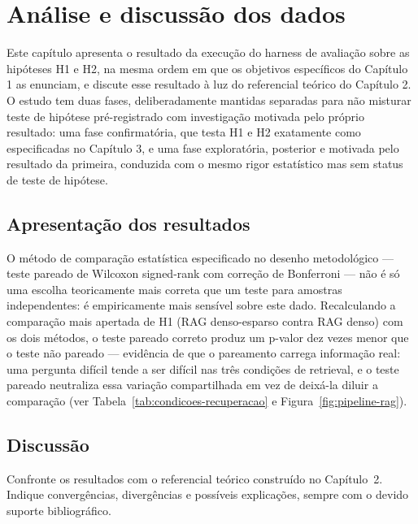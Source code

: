 
\section{Análise e discussão dos dados}

Este capítulo apresenta o resultado da execução do harness de avaliação
sobre as hipóteses H1 e H2, na mesma ordem em que os objetivos específicos
do Capítulo 1 as enunciam, e discute esse resultado à luz do referencial
teórico do Capítulo 2. O estudo tem duas fases, deliberadamente mantidas
separadas para não misturar teste de hipótese pré-registrado com
investigação motivada pelo próprio resultado: uma fase confirmatória, que
testa H1 e H2 exatamente como especificadas no Capítulo 3, e uma fase
exploratória, posterior e motivada pelo resultado da primeira, conduzida
com o mesmo rigor estatístico mas sem status de teste de hipótese.

\subsection{Apresentação dos resultados}

O método de comparação estatística especificado no desenho metodológico ---
teste pareado de Wilcoxon signed-rank com correção de Bonferroni --- não é só
uma escolha teoricamente mais correta que um teste para amostras
independentes: é empiricamente mais sensível sobre este dado. Recalculando a
comparação mais apertada de H1 (RAG denso-esparso contra RAG denso) com os
dois métodos, o teste pareado correto produz um p-valor dez vezes menor que
o teste não pareado --- evidência de que o pareamento carrega informação
real: uma pergunta difícil tende a ser difícil nas três condições de
retrieval, e o teste pareado neutraliza essa variação compartilhada em vez
de deixá-la diluir a comparação (ver Tabela~\ref{tab:condicoes-recuperacao}
e Figura~\ref{fig:pipeline-rag}).

\subsection{Discussão}

Confronte os resultados com o referencial teórico construído no Capítulo~2.
Indique convergências, divergências e possíveis explicações, sempre com o devido
suporte bibliográfico.
